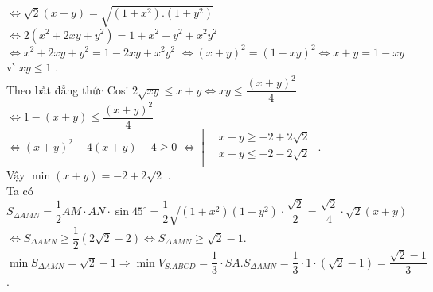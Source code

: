\begin{ex}
{		$\Leftrightarrow\sqrt{2}\left(x+y\right)=\sqrt{\left(1+x^2\right).\left(1+y^2\right)}$ $\Leftrightarrow 2\left(x^2+2xy+y^2\right)=1+x^2+y^2+x^2y^2$\\
		$\Leftrightarrow{x^2}+2xy+y^2=1-2xy+x^2y^2$ $\Leftrightarrow{\left(x+y\right)^2}=\left(1-xy\right)^2\Leftrightarrow x+y=1-xy$ vì $xy\le 1$ .\\
		Theo bất đẳng thức Cosi $2\sqrt{xy}\le x+y\Leftrightarrow xy\le\dfrac{\left(x+y\right)^2}{4}$ $\Leftrightarrow 1-\left(x+y\right)\le\dfrac{\left(x+y\right)^2}{4}$\\
		$\Leftrightarrow{\left(x+y\right)^2}+4\left(x+y\right)-4\ge 0$ $\Leftrightarrow\left[\begin{aligned}
			&x+y\ge-2+2\sqrt{2}\\
			&x+y\le-2-2\sqrt{2}\\
		\end{aligned}\right.$ .\\
		Vậy $\min\left(x+y\right)=-2+2\sqrt{2}$ .\\
		Ta có $S_{\Delta AMN}=\dfrac{1}{2}AM\cdot AN\cdot \sin 45^\circ=\dfrac{1}{2}\sqrt{\left(1+x^2\right)\left(1+y^2\right)}\cdot\dfrac{\sqrt{2}}{2}=\dfrac{\sqrt{2}}{4}\cdot\sqrt{2}\left(x+y\right)$\\
		$\Leftrightarrow{S_{\Delta AMN}} \ge \dfrac{1}{2}\left(2\sqrt{2}-2\right)\Leftrightarrow{S_{\Delta AMN}} \ge \sqrt{2}-1$.\\
		$\min{S_{\Delta AMN}}=\sqrt{2}-1\Rightarrow\min{V_{S.ABCD}}=\dfrac{1}{3}\cdot SA.S_{\Delta AMN}=\dfrac{1}{3}\cdot1\cdot\left(\sqrt{2}-1\right)=\dfrac{\sqrt{2}-1}{3}$.
	}
\end{ex}

